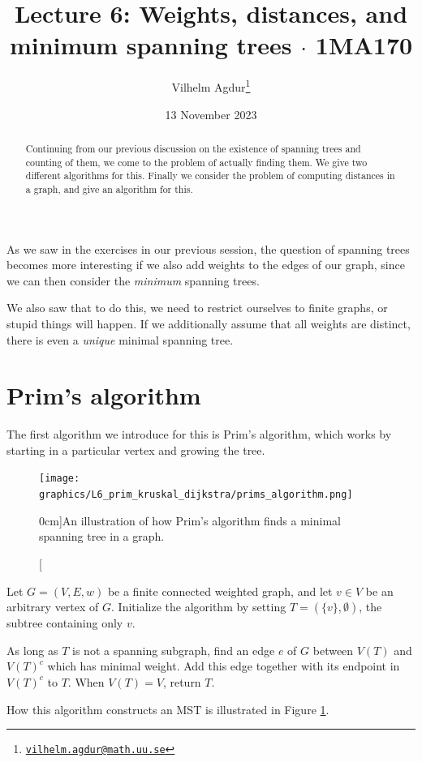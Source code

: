 \documentclass[nobib]{tufte-handout}
\title{Lecture 6: Weights, distances, and minimum spanning trees $\cdot$ 1MA170}
\author[Vilhelm Agdur]{Vilhelm Agdur\thanks{\href{mailto:vilhelm.agdur@math.uu.se}{\nolinkurl{vilhelm.agdur@math.uu.se}}}}
\date{13 November 2023}
\begin{document}
\maketitle%

\begin{abstract}
\noindent
Continuing from our previous discussion on the existence of spanning trees and counting of them, we come to the problem of actually finding them. We give two different algorithms for this. Finally we consider the problem of computing distances in a graph, and give an algorithm for this.
\end{abstract}

As we saw in the exercises in our previous session, the question of spanning trees becomes more interesting if we also add weights to the edges of our graph, since we can then consider the \emph{minimum} spanning trees.

We also saw that to do this, we need to restrict ourselves to finite graphs, or stupid things will happen. If we additionally assume that all weights are distinct, there is even a \emph{unique} minimal spanning tree.

\section{Prim's algorithm}

The first algorithm we introduce for this is Prim's algorithm, which works by starting in a particular vertex and growing the tree.

\begin{figure}
  \centering
  \texttt{[image: graphics/L6\_prim\_kruskal\_dijkstra/prims\_algorithm.png]}
  \caption[][0cm]{An illustration of how Prim's algorithm finds a minimal spanning tree in a graph.}
  \label{fig:prims_algorithm}
\end{figure}

\begin{definition}
  Let $G = (V,E,w)$ be a finite connected weighted graph, and let $v \in V$ be an arbitrary vertex of $G$. Initialize the algorithm by setting $T = (\{v\}, \emptyset)$, the subtree containing only $v$.

  As long as $T$ is not a spanning subgraph, find an edge $e$ of $G$ between $V(T)$ and $V(T)^c$ which has minimal weight. Add this edge together with its endpoint in $V(T)^c$ to $T$. When $V(T) = V$, return $T$.

  How this algorithm constructs an MST is illustrated in Figure \ref{fig:prims_algorithm}.
\end{definition}
\end{document}
